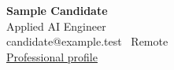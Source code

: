\documentclass[main.tex]{subfiles}
\begin{document}
\begin{center}
  \textbf{\Large Sample Candidate}\\
  {Applied AI Engineer}\\
  {candidate@example.test \textbullet\ Remote}\\
  {\href{https://example.test/profile}{Professional profile}}
\end{center}
\end{document}

